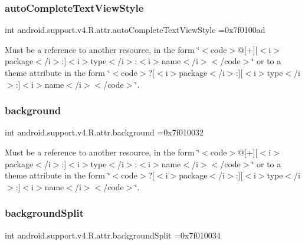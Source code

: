 \subsubsection{\texorpdfstring{auto\+Complete\+Text\+View\+Style}{autoCompleteTextViewStyle}}
{\footnotesize\ttfamily int android.\+support.\+v4.\+R.\+attr.\+auto\+Complete\+Text\+View\+Style =0x7f0100ad\hspace{0.3cm}{\ttfamily [static]}}

Must be a reference to another resource, in the form \char`\"{}$<$code$>$@\mbox{[}+\mbox{]}\mbox{[}$<$i$>$package$<$/i$>$\+:\mbox{]}$<$i$>$type$<$/i$>$\+:$<$i$>$name$<$/i$>$$<$/code$>$\char`\"{} or to a theme attribute in the form \char`\"{}$<$code$>$?\mbox{[}$<$i$>$package$<$/i$>$\+:\mbox{]}\mbox{[}$<$i$>$type$<$/i$>$\+:\mbox{]}$<$i$>$name$<$/i$>$$<$/code$>$\char`\"{}. \mbox{\label{classandroid_1_1support_1_1v4_1_1R_1_1attr_a3aa8b955b1ba13d9d418c7ac9c23b291}} 
\subsubsection{\texorpdfstring{background}{background}}
{\footnotesize\ttfamily int android.\+support.\+v4.\+R.\+attr.\+background =0x7f010032\hspace{0.3cm}{\ttfamily [static]}}

Must be a reference to another resource, in the form \char`\"{}$<$code$>$@\mbox{[}+\mbox{]}\mbox{[}$<$i$>$package$<$/i$>$\+:\mbox{]}$<$i$>$type$<$/i$>$\+:$<$i$>$name$<$/i$>$$<$/code$>$\char`\"{} or to a theme attribute in the form \char`\"{}$<$code$>$?\mbox{[}$<$i$>$package$<$/i$>$\+:\mbox{]}\mbox{[}$<$i$>$type$<$/i$>$\+:\mbox{]}$<$i$>$name$<$/i$>$$<$/code$>$\char`\"{}. \mbox{\label{classandroid_1_1support_1_1v4_1_1R_1_1attr_accf7c5a5b1116cb065de3d8e2451c213}} 
\subsubsection{\texorpdfstring{background\+Split}{backgroundSplit}}
{\footnotesize\ttfamily int android.\+support.\+v4.\+R.\+attr.\+background\+Split =0x7f010034\hspace{0.3cm}{\ttfamily [static]}}

